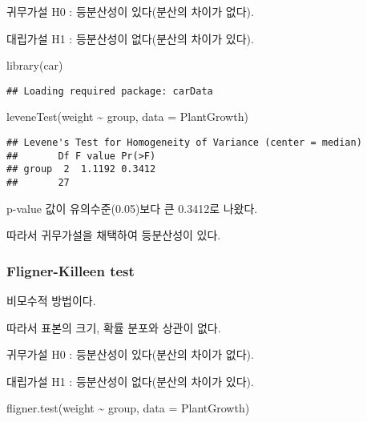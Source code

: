 \documentclass[
]{article}
\newenvironment{Shaded}{\begin{snugshade}}{\end{snugshade}}
\newcommand{\AttributeTok}[1]{\textcolor[rgb]{0.77,0.63,0.00}{#1}}
\newcommand{\FunctionTok}[1]{\textcolor[rgb]{0.00,0.00,0.00}{#1}}
\newcommand{\NormalTok}[1]{#1}
\newcommand{\SpecialCharTok}[1]{\textcolor[rgb]{0.00,0.00,0.00}{#1}}
\begin{document}
귀무가설 H0 : 등분산성이 있다(분산의 차이가 없다).

대립가설 H1 : 등분산성이 없다(분산의 차이가 있다).

\begin{Shaded}
\begin{Highlighting}[]
\FunctionTok{library}\NormalTok{(car)}
\end{Highlighting}
\end{Shaded}

\begin{verbatim}
## Loading required package: carData
\end{verbatim}

\begin{Shaded}
\begin{Highlighting}[]
\FunctionTok{leveneTest}\NormalTok{(weight }\SpecialCharTok{\textasciitilde{}}\NormalTok{ group, }\AttributeTok{data =}\NormalTok{ PlantGrowth)}
\end{Highlighting}
\end{Shaded}

\begin{verbatim}
## Levene's Test for Homogeneity of Variance (center = median)
##       Df F value Pr(>F)
## group  2  1.1192 0.3412
##       27
\end{verbatim}

p-value 값이 유의수준(0.05)보다 큰 0.3412로 나왔다.

따라서 귀무가설을 채택하여 등분산성이 있다.

\hypertarget{fligner-killeen-test}{%
\subsubsection{Fligner-Killeen test}\label{fligner-killeen-test}}

비모수적 방법이다.

따라서 표본의 크기, 확률 분포와 상관이 없다.

귀무가설 H0 : 등분산성이 있다(분산의 차이가 없다).

대립가설 H1 : 등분산성이 없다(분산의 차이가 있다).

\begin{Shaded}
\begin{Highlighting}[]
\FunctionTok{fligner.test}\NormalTok{(weight }\SpecialCharTok{\textasciitilde{}}\NormalTok{ group, }\AttributeTok{data =}\NormalTok{ PlantGrowth)}
\end{Highlighting}
\end{Shaded}
\end{document}
